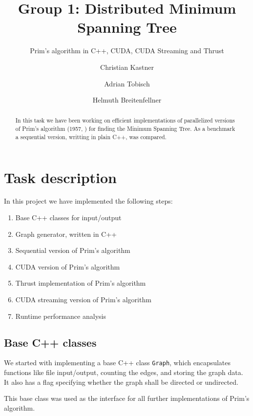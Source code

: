 \documentclass[sigconf,nonacm]{acmart}
\begin{document}
\title{Group 1: Distributed Minimum Spanning Tree}
\subtitle{Prim's algorithm in C++, CUDA, CUDA Streaming and Thrust}
\author{Christian Kastner}
\author{Adrian Tobisch}
\author{Helmuth Breitenfellner}
\begin{abstract}
In this task we have been working on efficient implementations of
parallelized versions of Prim's algorithm (1957, \cite{prim1957}) for finding the Minimum Spanning Tree.
As a benchmark a sequential version, writting in plain C++, was compared.
\end{abstract}
\maketitle
\section{Task description}

In this project we have implemented the following steps:
\begin{enumerate}
\item Base C++ classes for input/output
\item Graph generator, written in C++
\item Sequential version of Prim's algorithm
\item CUDA version of Prim's algorithm
\item Thrust implementation of Prim's algorithm
\item CUDA streaming version of Prim's algorithm
\item Runtime performance analysis
\end{enumerate}

\subsection{Base C++ classes}

We started with implementing a base C++ class \texttt{Graph},
which encapsulates functions like file input/output, counting the edges,
and storing the graph data.
It also has a flag specifying whether the graph shall be directed or
undirected.

This base class was used as the interface for all further implementations
of Prim's algorithm.
\end{document}
